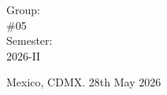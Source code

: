 \documentclass[letterpaper,12pt,oneside]{article}
\begin{document}
\begin{titlepage}
\begin{center}
\begin{center}
				\bigskip
				
				Group: \\
				\#05\\
				Semester: \\
                2026-II
			\end{center}
			
			\vfill
			
			\begin{center}
				{Mexico, CDMX. 28th May 2026}\\
			\end{center}
			\cleardoublepage
		\end{center}
	\end{titlepage}
 
\tableofcontents
\clearpage
    
\end{document}
